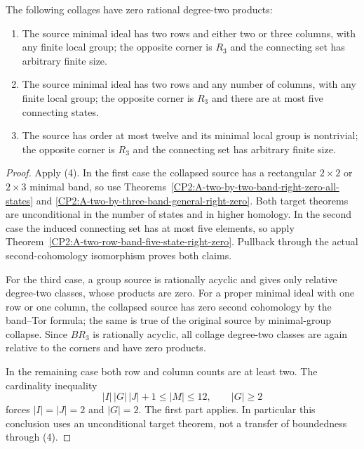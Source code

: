 \begin{corollary}
\label{CP2:A-Rees-two-row-right-zero-gates}
The following collages have zero rational degree-two products:
\begin{enumerate}
\item The source minimal ideal has two rows and either two or three
columns, with any finite local group; the opposite corner is $R_3$
and the connecting set has arbitrary finite size.
\item The source minimal ideal has two rows and any number of columns,
with any finite local group; the opposite corner is $R_3$ and there
are at most five connecting states.
\item The source has order at most twelve and its minimal local group
is nontrivial; the opposite corner is $R_3$ and the connecting set
has arbitrary finite size.
\end{enumerate}
\end{corollary}
\begin{proof}
Apply (4).  In the first case the collapsed source has a rectangular
$2\times2$ or $2\times3$ minimal band, so use
Theorems~\ref{CP2:A-two-by-two-band-right-zero-all-states} and
\ref{CP2:A-two-by-three-band-general-right-zero}.  Both target
theorems are unconditional in the number of states and in higher
homology.  In the second case the induced connecting set has at
most five elements, so apply
Theorem~\ref{CP2:A-two-row-band-five-state-right-zero}.  Pullback
through the actual second-cohomology isomorphism proves both claims.

For the third case, a group source is rationally acyclic and gives
only relative degree-two classes, whose products are zero.  For a
proper minimal ideal with one row or one column, the collapsed
source has zero second cohomology by the band--Tor formula; the same
is true of the original source by minimal-group collapse.  Since
$BR_3$ is rationally acyclic, all collage degree-two classes are
again relative to the corners and have zero products.

In the remaining case both row and column counts are at least two.
The cardinality inequality
\[
 |I|\,|G|\,|J|+1\leq |M|\leq12,
 \qquad |G|\geq2
\]
forces $|I|=|J|=2$ and $|G|=2$.  The first part applies.  In
particular this conclusion uses an unconditional target theorem,
not a transfer of boundedness through (4).
\end{proof}
